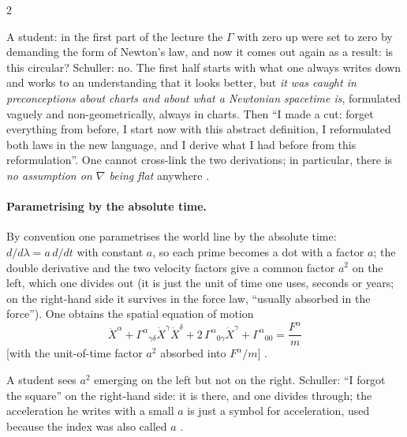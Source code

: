 \begin{paracol}{2}
\begin{coursenote}[Student question: why do we not just recover $\Gamma=0$?]
A student: in the first part of the lecture the $\Gamma$ with zero up were set to zero by demanding the form of Newton's law, and now it comes out again as a result: is this circular? Schuller: no. The first half starts with what one always writes down and works to an understanding that it looks better, but \emph{it was caught in preconceptions about charts and about what a Newtonian spacetime is}, formulated vaguely and non-geometrically, always in charts. Then ``I made a cut: forget everything from before, I start now with this abstract definition, I reformulated both laws in the new language, and I derive what I had before from this reformulation''. One cannot cross-link the two derivations; in particular, there is \emph{no assumption on $\nabla$ being flat} anywhere .
\end{coursenote}

\paragraph{Parametrising by the absolute time.} By convention one parametrises the world line by the absolute time: $d/d\lambda=a\,d/dt$ with constant $a$, so each prime becomes a dot with a factor $a$; the double derivative and the two velocity factors give a common factor $a^2$ on the left, which one divides out (it is just the unit of time one uses, seconds or years; on the right-hand side it survives in the force law, ``usually absorbed in the force''). One obtains the spatial equation of motion
\[
  \ddot X^\alpha+\Gamma^\alpha{}_{\gamma\delta}\dot X^\gamma\dot X^\delta+2\,\Gamma^\alpha{}_{0\gamma}\dot X^\gamma+\Gamma^\alpha{}_{00}=\frac{F^\alpha}{m}
\]
[with the unit-of-time factor $a^2$ absorbed into $F^\alpha/m$]
.
\begin{coursenote}
A student sees $a^2$ emerging on the left but not on the right. Schuller: ``I forgot the square'' on the right-hand side: it is there, and one divides through; the acceleration he writes with a small $a$ is just a symbol for acceleration, used because the index was also called $a$
.
\end{coursenote}


\end{paracol}
